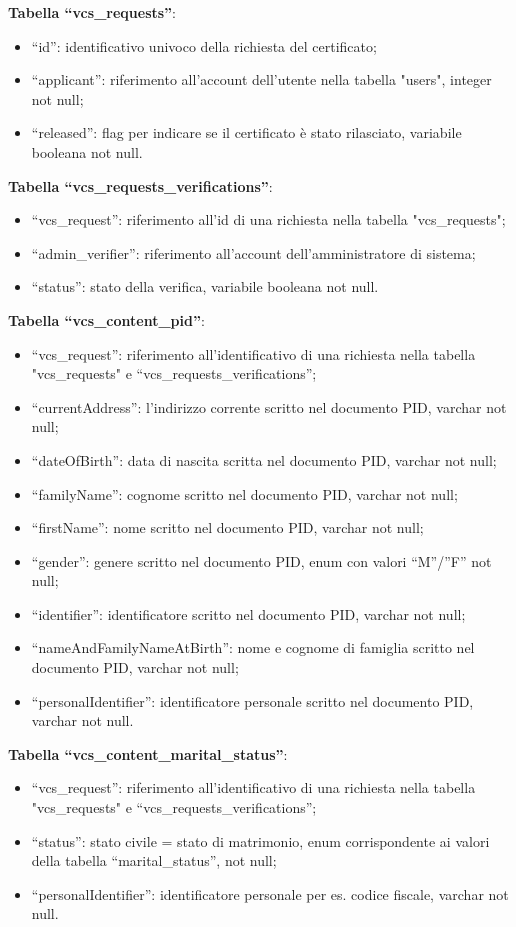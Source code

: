 \textbf{Tabella “vcs\_requests”}:
\begin{itemize}
    \item “id”: identificativo univoco della richiesta del certificato; 
    \item “applicant”: riferimento all'account dell'utente nella tabella "users", integer not null;  
    \item “released”: flag per indicare se il certificato è stato rilasciato, variabile booleana not null. 
\end{itemize}

\textbf{Tabella “vcs\_requests\_verifications”}:
\begin{itemize}
    \item “vcs\_request”: riferimento all'id di una richiesta nella tabella "vcs\_requests";  
    \item “admin\_verifier”: riferimento all'account dell'amministratore di sistema;  
    \item “status”: stato della verifica, variabile booleana not null. 
\end{itemize}

\textbf{Tabella “vcs\_content\_pid”}:
\begin{itemize}
    \item “vcs\_request”: riferimento all'identificativo di una richiesta nella tabella "vcs\_requests" e “vcs\_requests\_verifications”; 
    \item “currentAddress”: l’indirizzo corrente scritto nel documento PID, varchar not null; 
    \item “dateOfBirth”: data di nascita scritta nel documento PID, varchar not null;  
    \item “familyName”: cognome scritto nel documento PID, varchar not null; 
    \item “firstName”: nome scritto nel documento PID, varchar not null; 
    \item “gender”: genere scritto nel documento PID, enum con valori “M”/”F” not null; 
    \item “identifier”: identificatore scritto nel documento PID, varchar not null; 
    \item “nameAndFamilyNameAtBirth”: nome e cognome di famiglia scritto nel documento PID, varchar not null;
    \item “personalIdentifier”: identificatore personale scritto nel documento PID, varchar not null.
\end{itemize}

\textbf{Tabella “vcs\_content\_marital\_status”}:
\begin{itemize}
    \item “vcs\_request”: riferimento all'identificativo di una richiesta nella tabella "vcs\_requests" e “vcs\_requests\_verifications”; 
    \item “status”: stato civile = stato di matrimonio, enum corrispondente ai valori della tabella “marital\_status”, not null;  
    \item “personalIdentifier”: identificatore personale per es. codice fiscale, varchar not null.
\end{itemize}


